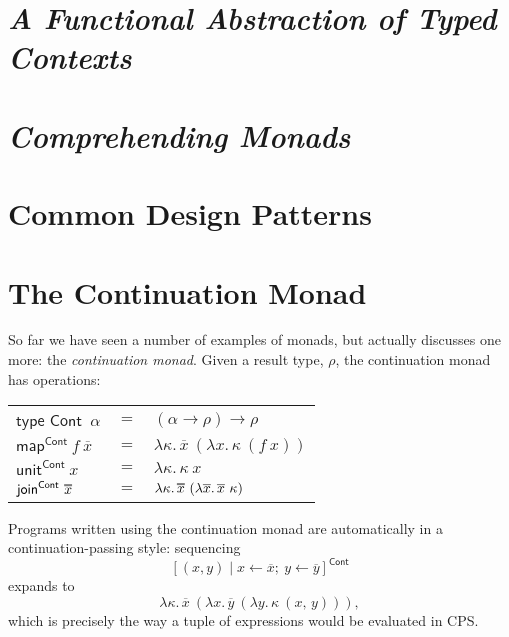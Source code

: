 \documentclass[acmsmall, nonacm, screen]{acmart}
\newcommand\doverline[1]{%
  \setbox0=\hbox{$\overline{#1}$}%
  \ht0=\dimexpr\ht0-.30ex\relax%
  \overline{\copy0}%
}
\newcommand{\lambdaE}[2]{\lambda #1.\, #2}
\newcommand{\map}[3]{\textsf{map}^{\textsf{#1}}~#2~#3}
\newcommand{\unit}[2]{\textsf{unit}^{\textsf{#1}}~#2}
\newcommand{\join}[2]{\textsf{join}^{\textsf{#1}}~#2}
\begin{document}
\section{{\em A Functional Abstraction of Typed Contexts}} \label{sec:danvy}

\section{{\em Comprehending Monads}} \label{sec:wadler}

\section{Common Design Patterns} \label{sec:patterns}

\section{The Continuation Monad} \label{sec:contmonad}
So far we have seen a number of examples of monads, but \citeauthor{wadler1990comprehending}
actually discusses one more: the {\em continuation monad}. Given a result type, $\rho$, the
continuation monad has operations:
\begin{center}
  \begin{tabular}{lll}
    $\textsf{type Cont}$~$\alpha$ & $=$ & $(\alpha \to \rho) \to \rho$ \\
    $\map{Cont}{f}{\overline{x}}$ & $=$ & $\lambdaE{\kappa}{\overline{x}~(\lambdaE{x}{\kappa~(f~x)})}$ \\
    $\unit{Cont}{x}$ & $=$ & $\lambdaE{\kappa}{\kappa~x}$ \\
    $\join{Cont}{\doverline{x}}$ & $=$ &
      $\lambdaE{\kappa}{\doverline{x}~(\lambdaE{\overline{x}}{\overline{x}~\kappa})}$
  \end{tabular}
\end{center}
Programs written using the continuation monad are automatically in a continuation-passing style:
sequencing
\[ [(x, y) \mid x \leftarrow \overline{x};\ y \leftarrow \overline{y}]^{\textsf{Cont}} \]
expands to
\[ \lambdaE{\kappa}{\overline{x}~(\lambdaE{x}{\overline{y}~(\lambdaE{y}{\kappa~(x,\, y)})})}, \]
which is precisely the way a tuple of expressions would be evaluated in CPS.
\end{document}
